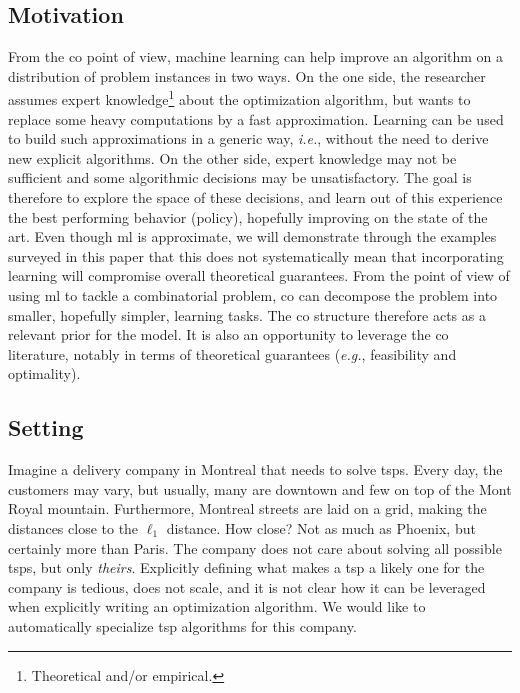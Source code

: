 \documentclass[11pt]{article}
\begin{document}
	\subsection{Motivation}
		\label{sec:motivation}
		From the \gls{co} point of view, machine learning can help improve an algorithm on a distribution
		of problem instances in two ways.
		On the one side, the researcher assumes expert knowledge\footnote{Theoretical and/or empirical.
		} about the optimization algorithm, but wants to replace some heavy computations by a
		fast approximation.
		Learning can be used to build such approximations in a generic way, \textit{i.e.}, without the need
		to derive new explicit algorithms.
		On the other side, expert knowledge may not be sufficient and some
		algorithmic decisions may be unsatisfactory.
		The goal is therefore to explore the space of these decisions, and learn out of this experience the
		best performing behavior (policy), hopefully improving on the state of the art.
		Even though \gls{ml} is approximate, we will demonstrate through the examples surveyed in this
		paper that this does not systematically mean that incorporating learning will compromise overall
		theoretical guarantees.
		From the point of view of using \gls{ml} to tackle a combinatorial problem, \gls{co} can decompose
		the problem into smaller, hopefully simpler, learning tasks.
		The \gls{co} structure therefore acts as a relevant prior for the model.
		It is also an opportunity to leverage the \gls{co} literature, notably in terms of theoretical
		guarantees (\textit{e.g.}, feasibility and optimality).

	\subsection{Setting}
		Imagine a delivery company in Montreal that needs to solve \glspl{tsp}.
		Every day, the customers may vary, but usually, many are downtown and few on top of the Mont Royal
		mountain.
		Furthermore, Montreal streets are laid on a grid, making the distances close to the $\ell_1$
		distance.
		How close?
		Not as much as Phoenix, but certainly more than Paris.
		The company does not care about solving all possible \glspl{tsp}, but only \emph{theirs}.
		Explicitly defining what makes a \gls{tsp} a likely one for the company is tedious, does not scale, and it
		is not clear how it can be leveraged when explicitly writing an optimization algorithm.
		We would like to automatically specialize \gls{tsp} algorithms for this company.
\end{document}
